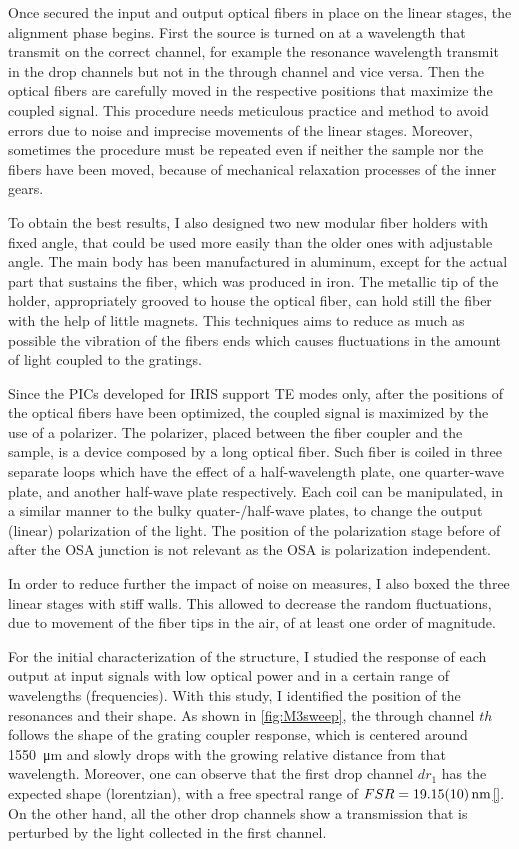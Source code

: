 Once secured the input and output optical fibers in place on the linear stages, the alignment phase begins.
First the source is turned on at a wavelength that transmit on the correct channel, for example the resonance wavelength transmit in the drop channels but not in the through channel and vice versa.
Then the optical fibers are carefully moved in the respective positions that maximize the coupled signal.
This procedure needs meticulous practice and method to avoid errors due to noise and imprecise movements of the linear stages.
Moreover, sometimes the procedure must be repeated even if neither the sample nor the fibers have been moved, because of mechanical relaxation processes of the inner gears.

To obtain the best results, I also designed two new modular fiber holders with fixed angle, that could be used more easily than the older ones with adjustable angle.
The main body has been manufactured in aluminum, except for the actual part that sustains the fiber, which was produced in iron.
The metallic tip of the holder, appropriately grooved to house the optical fiber, can hold still the fiber with the help of little magnets.
This techniques aims to reduce as much as possible the vibration of the fibers ends which causes fluctuations in the amount of light coupled to the gratings.

Since the PICs developed for IRIS support TE modes only, after the positions of the optical fibers have been optimized, the coupled signal is maximized by the use of a polarizer.
The polarizer, placed between the fiber coupler and the sample, is a device composed by a long optical fiber.
Such fiber is coiled in three separate loops which have the effect of a half-wavelength plate, one quarter-wave plate, and another half-wave plate respectively.
Each coil can be manipulated, in a similar manner to the bulky quater-/half-wave plates, to change the output (linear) polarization of the light.
The position of the polarization stage before of after the OSA junction is not relevant as the OSA is polarization independent.

In order to reduce further the impact of noise on measures, I also boxed the three linear stages with stiff walls.
This allowed to decrease the random fluctuations, due to movement of the fiber tips in the air, of at least one order of magnitude.

For the initial characterization of the structure, I studied the response of each output at input signals with low optical power and in a certain range of wavelengths (frequencies).
With this study, I identified the position of the resonances and their shape.
As shown in \autoref{fig:M3sweep}, the through channel $th$ follows the shape of the grating coupler response, which is centered around \SI{1550}{\um} and slowly drops with the growing relative distance from that wavelength.
Moreover, one can observe that the first drop channel $dr_1$ has the expected shape (lorentzian), with a free spectral range of $FSR=\SI{19.15+-.1}{\nm}$\ref{}.
On the other hand, all the other drop channels show a transmission that is perturbed by the light collected in the first channel.

